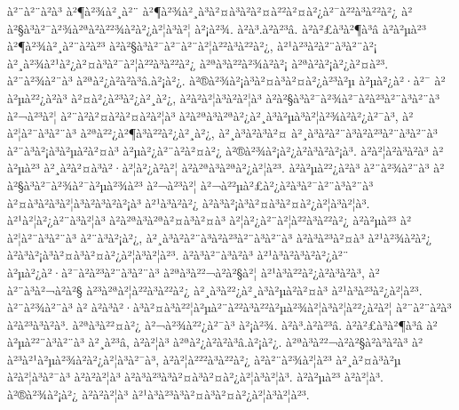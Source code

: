 à²¨à²¨à²à³ à²¶à²¾à²¸à²¨ à²¶à²¾à²¸à³à²¤à³à²\circ à²¤à²²à²¤à²¿à²¯à²²à³à²²à²¿ à²à²§à³à²¯à²¾à²ªà²à²²¾à²à²¿à²¦à³à²¦ à²¡à²¾. à²à³.à²à²³â. à²à²£à³à²¶à³â à²à²µà²³ à²¶à²¾à²¸à²¨à²à²³ à²à²§à³à²¯à²¯à²¨à²¦à²²à³à²²à²¿, à²¹à²³à²à²¨à³à²¨à²¡ à²¸à²¾à²¹à²¿à²¤à³à²¯à²¦à²²à³à²²à²¿ à²ªà³à²²à²¾à²à²¡ à²ªà²à²¡à²¿à²¤à²³. à²¨à²¾à²¨à³ à²ªà²¿à²à²à³â.à²¡à²¿. à²®à²¾à²¡à³à²¤à³à²¤à²¿à²³à²µ à²µà²¿à²·à²¯ à²à²µà²²¿à²à³ à²¤à²¿à²³à²¿à²¸à²¿, à²à²à²¦à³à²à²¦à³ à²à²§à³à²¯à²¾à²¯à²à²³à²¨à³à²¨à³ à²¬à²³à²¦ à²¨à²à²¤à²\circ à²¤à²à²¦à³ à²à²ªà³à²ªà²¿à²¸à³à²µà³à²¦à²¾à²à²¿à²¯à³, à²à²¦à²¨à³à²¨à³ à²ªà²²¿à²¶à³à²²à²¿à²¸à²¿, à²¸à³à²à³à²¤ à²¸à³à²à²¨à³à²à²³à²¨à³à²¨à³ à²¨à³à²¡à³à²µà²à²¤à³ à²µà²¿à²¨à²à²¤à²¿ à²®à²¾à²¡à²¿à²à³à²à²¡à³. à²à²¦à²à³à²à³ à²à²µà²³ à²¸à²à²¤à³à²·à²¦à²¿à²à²¦ à²à²ªà³à²ªà²¿à²¦à²³. à²à²µà²²¿à²à³ à²¨à²¾à²¨à³ à²à²§à³à²¯à²¾à²¯à²µà²¾à²³ à²¬à²³à²¦ à²¬à²²µà²£à²¿à²à³à²¯à²¨à³à²¨à³ à²¤à³à²à³à²¦à³à²à³à²à²¡à³ à²¹à³à²à²¿ à²à³à²¡à³à²¤à³à²¤à²¿à²¦à³à²¦à³. à²¹à²¦à²¿à²¨à³à²¦à³ à²à²ªà³à²ªà²¤à³à²¤à³ à²¦à²¿à²¨à²¦à²²à³à²²à²¿ à²à²µà²³ à²à²¦à²¨à³à²¨à³ à²¨à³à²¡à²¿, à²¸à³à²à²¨à³à²à²³à²¨à³à²¨à³ à²à³à²³à²¤à³ à²¹à²¾à²à²¿ à²à³à²¡à³à²¤à³à²¤à²¿à²¦à³à²¦à²³. à²à³à²¨à³à²à³ à²¹à³à²à³à²à²¿à²¨ à²µà²¿à²·à²¯à²à²³à²¨à³à²¨à³ à²ªà³à²²¬à²à²§à²¦ à²¹à³à²²à²¿à²à³à²à³, à²à²¨à³à²¬à²à²§ à²³à²ªà²¦à²²à³à²²à²¿ à²¸à³à²²¿à²¸à³à²µà²à²¤à³ à²¹à³à²³à²¿à²¦à²³. à²¨à²¾à²¨à³ à² à²à³à²·à³à²¤à³à²²¦à²µà²¨à²²à³à²²à²µà²¾à²¦à³à²¦à²²¿à²à²¦ à²¨à²¨à²à³ à²à²³à³à²à³. à²ªà³à²²¤à²¿ à²¬à²¾à²²¿à²¯à³ à²¡à²¾. à²à³.à²à²³â. à²à²£à³à²¶à³â à²à²µà²²¨à³à²¨à³ à²¸à²³â, à²à²¦à³ à²ªà²¿à²à²à³â.à²¡à²¿. à²ªà³à²²¬à²à²§à²à³à²à³ à²à²³à²¹à²µà²¾à²à²¿à²¦à³à²¯à³, à²à²¦à²²²à³à²²à²¿ à²à²¨à²¾à²¦à²³ à²¸à²¤à³à²µ à²à²¦à³à²¯à³ à²à²à²¦à³ à²à³à²³à³à²¤à³à²¤à²¿à²¦à³à²¦à³. à²à²µà²³ à²à²¦à³. à²®à²¾à²¡à²¿ à²à²à²¦à³ à²¹à³à²³à³à²¤à³à²¤à²¿à²¦à³à²¦à²³.


